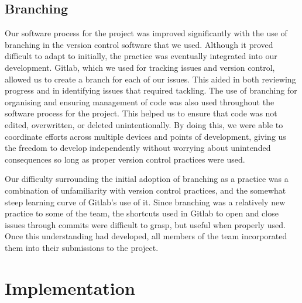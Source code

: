 \documentclass{l3proj}
\begin{document}
\subsection{Branching}
\label{subsec:branching}
Our software process for the project was improved significantly with the use of branching in the version control software that we used. Although it proved difficult to adapt to initially, the practice was eventually integrated into our development. Gitlab, which we used for tracking issues and version control, allowed us to create a branch for each of our issues. This aided in both reviewing progress and in identifying issues that required tackling. The use of branching for organising and ensuring management of code was also used throughout the software process for the project. This helped us to ensure that code was not edited, overwritten, or deleted unintentionally. By doing this, we were able to coordinate efforts across multiple devices and points of development, giving us the freedom to develop independently without worrying about unintended consequences so long as proper version control practices were used. \par
Our difficulty surrounding the initial adoption of branching as a practice was a combination of unfamiliarity with version control practices, and the somewhat steep learning curve of Gitlab's use of it. Since branching was a relatively new practice to some of the team, the shortcuts used in Gitlab to open and close issues through commits were difficult to grasp, but useful when properly used. Once this understanding had developed, all members of the team incorporated them into their submissions to the project. \par
\section{Implementation}
\label{sec: implementation}
\end{document}

